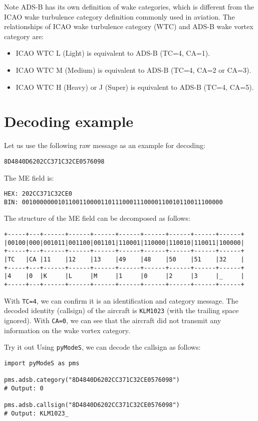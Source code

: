 Note ADS-B has its own definition of wake categories, which is different from the ICAO wake turbulence category definition commonly used in aviation. The relationships of ICAO wake turbulence category (WTC) and ADS-B wake vortex category are:

\begin{itemize}
    \item ICAO WTC L (Light) is equivalent to ADS-B (TC=4, CA=1). 
    \item ICAO WTC M (Medium) is equivalent to ADS-B (TC=4, CA=2 or CA=3). 
    \item ICAO WTC H (Heavy) or J (Super) is equivalent to ADS-B (TC=4, CA=5). 
\end{itemize}


\section{Decoding example}

Let us use the following raw message as an example for decoding:

\begin{verbatim}
8D4840D6202CC371C32CE0576098
\end{verbatim}

The ME field is:

\begin{verbatim}
HEX: 202CC371C32CE0
BIN: 00100000001011001100001101110001110000110010110011100000
\end{verbatim}

The structure of the ME field can be decomposed as follows:

\begin{verbatim}
+-----+---+------+------+------+------+------+------+------+------+
|00100|000|001011|001100|001101|110001|110000|110010|110011|100000|
+-----+---+------+------+------+------+------+------+------+------+
|TC   |CA |11    |12    |13    |49    |48    |50    |51    |32    |
+-----+---+------+------+------+------+------+------+------+------+
|4    |0  |K     |L     |M     |1     |0     |2     |3     |_     |
+-----+---+------+------+------+------+------+------+------+------+
\end{verbatim}

With \texttt{TC=4}, we can confirm it is an identification and category message. The decoded identity (callsign) of the aircraft is \texttt{KLM1023} (with the trailing space ignored). With \texttt{CA=0}, we can see that the aircraft did not transmit any information on the wake vortex category.

\begin{notebox}{Try it out}
Using \texttt{pyModeS}, we can decode the callsign as follows:

\begin{verbatim}
import pyModeS as pms

pms.adsb.category("8D4840D6202CC371C32CE0576098")
# Output: 0

pms.adsb.callsign("8D4840D6202CC371C32CE0576098")
# Output: KLM1023_
\end{verbatim}

\end{notebox}
 
  